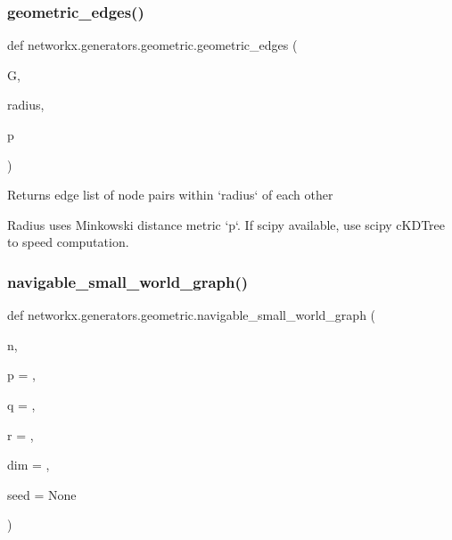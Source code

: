 \subsubsection{\texorpdfstring{geometric\+\_\+edges()}{geometric\_edges()}}
{\footnotesize\ttfamily def networkx.\+generators.\+geometric.\+geometric\+\_\+edges (\begin{DoxyParamCaption}\item[{}]{G,  }\item[{}]{radius,  }\item[{}]{p }\end{DoxyParamCaption})}

\begin{DoxyVerb}Returns edge list of node pairs within `radius` of each other

Radius uses Minkowski distance metric `p`.
If scipy available, use scipy cKDTree to speed computation.
\end{DoxyVerb}
 \mbox{\label{namespacenetworkx_1_1generators_1_1geometric_ac23a02dfb8c6fd5f1ec50680c7f7a59e}} 
\subsubsection{\texorpdfstring{navigable\+\_\+small\+\_\+world\+\_\+graph()}{navigable\_small\_world\_graph()}}
{\footnotesize\ttfamily def networkx.\+generators.\+geometric.\+navigable\+\_\+small\+\_\+world\+\_\+graph (\begin{DoxyParamCaption}\item[{}]{n,  }\item[{}]{p = {},  }\item[{}]{q = {},  }\item[{}]{r = {},  }\item[{}]{dim = {},  }\item[{}]{seed = {\ttfamily None} }\end{DoxyParamCaption})}

